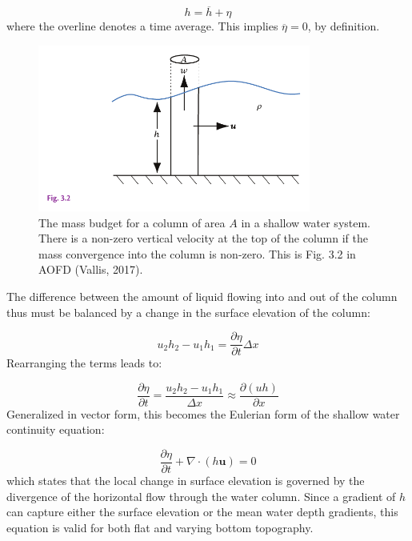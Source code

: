 \documentclass[12pt]{article}
\numberwithin{equation}{section}
\numberwithin{figure}{section}
\numberwithin{table}{section}
\begin{document}
\begin{equation}
  h = \overline{h} + \eta
\end{equation}
where the overline denotes a time average.
This implies $\overline{\eta} = 0$, by definition.

\begin{figure}[h]
  \centering
  \includegraphics[width=0.8\textwidth]{assets/fig_shallow_water2.pdf}
  \caption{
    The mass budget for a column of area $A$ in a shallow water system.
    There is a non-zero vertical velocity at the top of the column if the mass
    convergence into the column is non-zero.
    This is Fig. 3.2 in AOFD (Vallis, 2017).
  }
  \label{fig:shallow_water2}
\end{figure}

The difference between the amount of liquid flowing into and out of the column
thus must be balanced by a change in the surface elevation of the column:

\begin{equation}
  u_2 h_2 - u_1 h_1 = \frac{\partial \eta}{\partial t} \Delta x
\end{equation}
Rearranging the terms leads to:

\begin{equation}
  \frac{\partial \eta}{\partial t} = 
  \frac{u_2 h_2 - u_1 h_1}{\Delta x} \approx
  \frac{\partial (u h)}{\partial x}
  \label{eq:shallow_water_continuity1}
\end{equation}
Generalized in vector form, this becomes the Eulerian form of the shallow water
continuity equation:

\begin{equation}
  \frac{\partial \eta}{\partial t} + \nabla \cdot (h \mathbf{u}) = 0
  \label{eq:shallow_water_continuity2}
\end{equation}
which states that the local change in surface elevation is governed by the
divergence of the horizontal flow through the water column.
Since a gradient of $h$ can capture either the surface elevation or the mean
water depth gradients, this equation is valid for both flat and varying bottom
topography.
\end{document}
